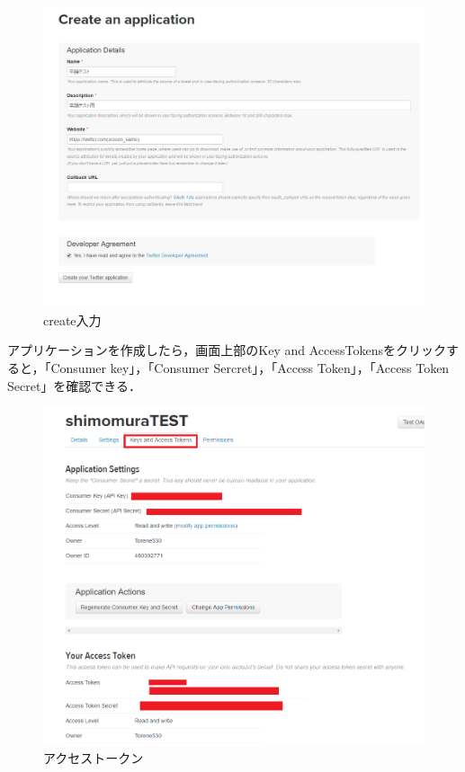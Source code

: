 \begin{figure}[htb]
\centering
\includegraphics[width=13cm]{create.png}
\caption{create入力}\label{create}
\end{figure}
\clearpage

アプリケーションを作成したら，画面上部のKey and AccessTokensをクリックすると，「Consumer key」，「Consumer Sercret」，「Access Token」，「Access Token Secret」を確認できる．
\begin{figure}[htb]
\centering
\includegraphics[width=13cm]{key.png}
\caption{アクセストークン}\label{key}
\end{figure}

